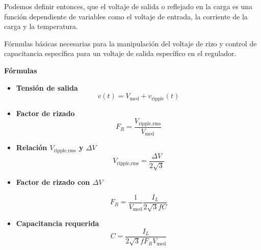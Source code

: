 \documentclass[pdflatex,sn-mathphys-num]{sn-jnl}%
\begin{document}
Podemos definir entonces, que el voltaje de salida o reflejado en la carga es una función dependiente de variables como el voltaje de entrada, la corriente de la carga y la temperatura.



Fórmulas básicas necesarias para la manipulación del voltaje de rizo y control de capacitancia específica para un voltaje de salida específico en el regulador.

\noindent
\begin{minipage}[t]{0.48\textwidth}
\textbf{Fórmulas}
\begin{itemize}
    \item \textbf{Tensión de salida}
    \[
        v(t) = V_{\text{med}} + v_{\text{ripple}}(t)
    \]

    \item \textbf{Factor de rizado}
    \[
        F_R = \frac{V_{\text{ripple,rms}}}{V_{\text{med}}}
    \]


    \item \textbf{Relación $V_{\text{ripple,rms}}$ y $\Delta V$}
    \[
        V_{\text{ripple,rms}} = \frac{\Delta V}{2\sqrt{3}}
    \]

    \item \textbf{Factor de rizado con $\Delta V$}

    \[
        F_R = \frac{1}{V_{\text{med}}}\frac{I_L}{2\sqrt{3}fC}
    \]

    \item \textbf{Capacitancia requerida}
    \[
        C = \frac{I_L}{2\sqrt{3}fF_RV_{\text{med}}}
    \]
\end{itemize}
\end{minipage}%
\hfill
\end{document}
